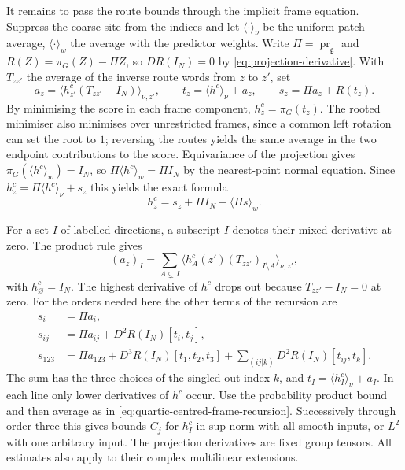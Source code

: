 \documentclass[11pt,reqno]{amsart}
\numberwithin{equation}{section}
\theoremstyle{definition}
\theoremstyle{remark}
\newcommand{\g}{\mathfrak g}
\begin{document}
It remains to pass the route bounds through the implicit
frame equation. Suppress the coarse site from the indices
and let \(\langle\cdot\rangle_\nu\) be the uniform patch average,
\(\langle\cdot\rangle_w\) the average with the predictor weights.
Write \(\Pi=\operatorname{pr}_{\g}\) and
\(R(Z)=\pi_G(Z)-\Pi Z\), so \(DR(I_N)=0\) by
\eqref{eq:projection-derivative}. With \(T_{zz'}\) the
average of the inverse route words from \(z\) to \(z'\), set
\[
 a_z=\big\langle h^c_{z'}(T_{zz'}-I_N)\big\rangle_{\nu,z'},
 \qquad t_z=\langle h^c\rangle_\nu+a_z,\qquad
 s_z=\Pi a_z+R(t_z).
\]
By minimising the score in each frame component,
\(h_z^c=\pi_G(t_z)\). The rooted minimiser also minimises
over unrestricted frames, since a common left rotation
can set the root to \(1\); reversing the routes yields the
same average in the two endpoint contributions to the score.
Equivariance of the projection gives
\(\pi_G(\langle h^c\rangle_w)=I_N\), so
\(\Pi\langle h^c\rangle_w=\Pi I_N\) by the nearest-point
normal equation. Since \(h_z^c=\Pi\langle h^c\rangle_\nu+s_z\)
this yields the exact formula
\begin{equation}
             h_z^c=s_z+\Pi I_N-\langle\Pi s\rangle_w .
 \label{eq:quartic-centred-frame-recursion}
\end{equation}

For a set \(I\) of labelled directions, a subscript \(I\)
denotes their mixed derivative at zero. The product rule
gives
\[
 (a_z)_I=\sum_{A\subsetneq I}
       \big\langle h^c_A(z') (T_{zz'})_{I\setminus A}
                 \big\rangle_{\nu,z'} ,
\]
with \(h^c_\varnothing=I_N\). The highest derivative of
\(h^c\) drops out because \(T_{zz'}-I_N=0\) at zero.
For the orders needed here the other terms of the recursion
are
\[
 \begin{aligned}
 s_i&=\Pi a_i,\\
 s_{ij}&=\Pi a_{ij}+D^2R(I_N)[t_i,t_j],\\
 s_{123}&=\Pi a_{123}+D^3R(I_N)[t_1,t_2,t_3]
               +\sum_{(ij|k)}D^2R(I_N)[t_{ij},t_k].
 \end{aligned}
\]
The sum has the three choices of the singled-out index \(k\),
and \(t_I=\langle h^c_I\rangle_\nu+a_I\).
In each line only lower derivatives of \(h^c\) occur.
Use the probability product bound and then average as in
\eqref{eq:quartic-centred-frame-recursion}. Successively
through order three this gives bounds \(C_j\) for
\(h^c_I\) in sup norm with all-smooth inputs, or \(L^2\)
with one arbitrary input. The projection derivatives are
fixed group tensors. All estimates also apply to their
complex multilinear extensions.
\end{document}
